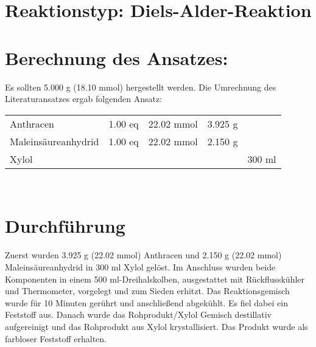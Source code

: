 \documentclass[12pt]{article}
\begin{document}
\begin{onehalfspace}
\section{Reaktionstyp: \textnormal{Diels-Alder-Reaktion}} 
\section{Berechnung des Ansatzes: } 
Es sollten 5.000 g (18.10 mmol)  hergestellt werden. Die Umrechnung des Literaturansatzes \cite{organikum} ergab folgenden Ansatz:\\[0.5cm]
\begin{tabular}{lrrrr}
Anthracen & 1.00 eq  & 22.02 mmol & 3.925 g & \\
Maleinsäureanhydrid  & 1.00 eq  & 22.02 mmol & 2.150 g & \\
Xylol  &   & &  & 300 ml\\
\end{tabular}\\[0.5cm]
\normalsize \section{Durchführung \cite{organikum}} 
Zuerst wurden 3.925 g (22.02 mmol) Anthracen und 2.150 g (22.02 mmol) Maleinsäureanhydrid in 300 ml Xylol gelöst. Im Anschluss wurden beide Komponenten in einem 500 ml-Dreihalskolben, ausgestattet mit Rückflusskühler und Thermometer, vorgelegt und zum Sieden erhitzt. Das Reaktionsgemisch wurde für 10 Minuten gerührt und anschließend abgekühlt. Es fiel dabei ein Feststoff aus. Danach wurde das Rohprodukt/Xylol Gemisch destillativ aufgereinigt und das Rohprodukt aus Xylol krystallisiert. Das Produkt wurde als farbloser Feststoff erhalten.


\end{onehalfspace}
\end{document}
